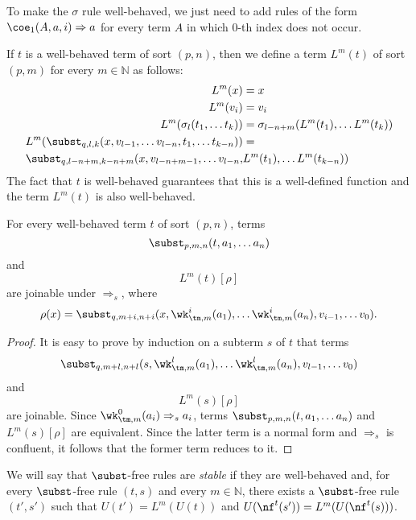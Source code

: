 \begin{example}
To make the $\sigma$ rule well-behaved, we just need to add rules of the form $\coe_1(A, a, i) \Rightarrow a$ for every term $A$ in which $0$-th index does not occur.
\end{example}

If $t$ is a well-behaved term of sort $(p,n)$, then we define a term $L^m(t)$ of sort $(p,m)$ for every $m \in \mathbb{N}$ as follows:
\begin{align*}
L^m(x) & = x \\
L^m(v_i) & = v_i \\
L^m(\sigma_l(t_1, \ldots t_k)) & = \sigma_{l-n+m}(L^m(t_1), \ldots L^m(t_k)) \\
L^m(\subst_{q,l,k}(x, v_{l-1}, \ldots v_{l-n}, t_1, \ldots t_{k-n})) & = \\
\subst_{q,l-n+m,k-n+m}(x, v_{l-n+m-1}, \ldots v_{l-n}, & L^m(t_1), \ldots L^m(t_{k-n}))
\end{align*}
The fact that $t$ is well-behaved guarantees that this is a well-defined function and the term $L^m(t)$ is also well-behaved.

\begin{lem}[lift]
For every well-behaved term $t$ of sort $(p,n)$, terms
\[ \subst_{p,m,n}(t, a_1, \ldots a_n) \]
and
\[ L^m(t)[\rho] \]
are joinable under $\Rightarrow_s$, where
\[ \rho(x) = \subst_{q,m+i,n+i}(x, \wk_{\tm,m}^i(a_1), \ldots \wk_{\tm,m}^i(a_n), v_{i-1}, \ldots v_0). \]
\end{lem}
\begin{proof}
It is easy to prove by induction on a subterm $s$ of $t$ that terms
\[ \subst_{q,m+l,n+l}(s, \wk_{\tm,m}^l(a_1), \ldots \wk_{\tm,m}^l(a_n), v_{l-1}, \ldots v_0) \]
and
\[ L^m(s)[\rho] \]
are joinable.
Since $\wk_{\tm,m}^0(a_i) \Rightarrow_s a_i$, terms $\subst_{p,m,n}(t, a_1, \ldots a_n)$ and $L^m(s)[\rho]$ are equivalent.
Since the latter term is a normal form and $\Rightarrow_s$ is confluent, it follows that the former term reduces to it.
\end{proof}

We will say that $\subst$-free rules are \emph{stable} if they are well-behaved and, for every $\subst$-free rule $(t,s)$ and every $m \in \mathbb{N}$,
there exists a $\subst$-free rule $(t',s')$ such that $U(t') = L^m(U(t))$ and $U(\nf^t(s')) = L^m(U(\nf^t(s)))$.

